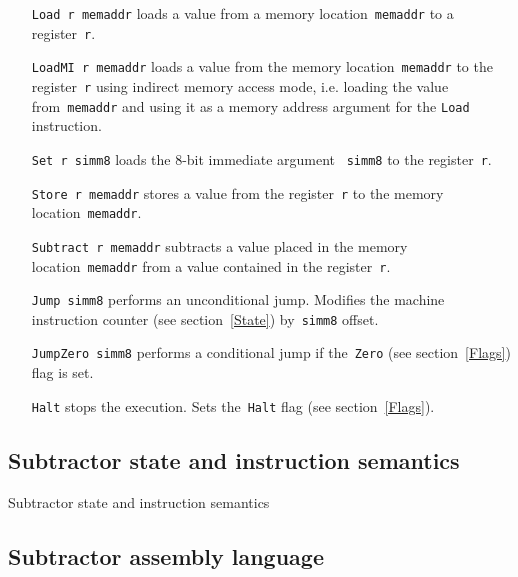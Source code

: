 \begin{itemize}
    \item[\texttt{Load r memaddr}] loads a value from a memory location~\texttt{memaddr} to a register~\texttt{r}.

    \item[\texttt{LoadMI r memaddr}] loads a value from the memory location~\texttt{memaddr} to the register~\texttt{r} using indirect memory access mode, i.e. loading the value from~\texttt{memaddr} and using it as a memory address argument for the \texttt{Load} instruction.

    \item[\texttt{Set r simm8}] loads the 8-bit immediate argument ~\texttt{simm8} to the register~\texttt{r}.

    \item[\texttt{Store r memaddr}] stores a value from the register~\texttt{r} to the memory location~\texttt{memaddr}.

    \item[\texttt{Subtract r memaddr}] subtracts a value placed in the memory location~\texttt{memaddr} from a value contained in the register~\texttt{r}.

    \item[\texttt{Jump simm8}] performs an unconditional jump. Modifies the machine instruction counter (see section~\ref{State}) by~\texttt{simm8} offset.

    \item[\texttt{JumpZero simm8}] performs a conditional jump if the~\texttt{Zero} (see section~\ref{Flags}) flag is set.

    \item[\texttt{Halt}] stops the execution. Sets the~\texttt{Halt} flag (see section~\ref{Flags}).
\end{itemize}

\subsection{Subtractor state and instruction semantics}

Subtractor state and instruction semantics

\subsection{Subtractor assembly language}

